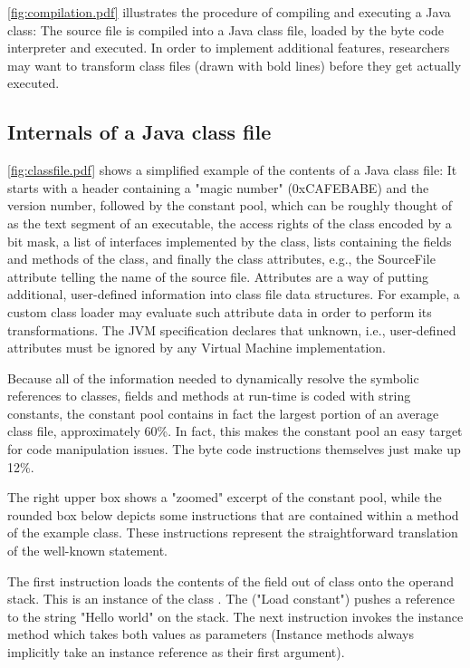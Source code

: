 \autoref{fig:compilation.pdf} illustrates the procedure of compiling and
executing a Java class: The source file is compiled into a Java class file,
loaded by the byte code interpreter and executed. In order to implement
additional features, researchers may want to transform class files (drawn with
bold lines) before they get actually executed.

\subsection{Internals of a Java class file}

\autoref{fig:classfile.pdf} shows a simplified example of the contents of a
Java class file: It starts with a header containing a "magic number"
(0xCAFEBABE) and the version number, followed by the constant pool, which can be
roughly thought of as the text segment of an executable, the access rights of
the class encoded by a bit mask, a list of interfaces implemented by the class,
lists containing the fields and methods of the class, and finally the class
attributes, e.g., the SourceFile attribute telling the name of the source file.
Attributes are a way of putting additional, user-defined information into class
file data structures. For example, a custom class loader may evaluate such
attribute data in order to perform its transformations. The JVM specification
declares that unknown, i.e., user-defined attributes must be ignored by any
Virtual Machine implementation.

Because all of the information needed to dynamically resolve the symbolic
references to classes, fields and methods at run-time is coded with string
constants, the constant pool contains in fact the largest portion of an average
class file, approximately 60\%. In fact, this makes the constant pool an easy
target for code manipulation issues. The byte code instructions themselves just
make up 12\%. 

The right upper box shows a "zoomed" excerpt of the constant pool, while the
rounded box below depicts some instructions that are contained within a method
of the example class. These instructions represent the straightforward
translation of the well-known  statement.

The first instruction loads the contents of the field out of class
 onto the operand stack. This is an instance of the class
. The  ("Load constant") pushes a reference
to the string "Hello world" on the stack. The next instruction invokes the
instance method  which takes both values as parameters (Instance
methods always implicitly take an instance reference as their first argument).

